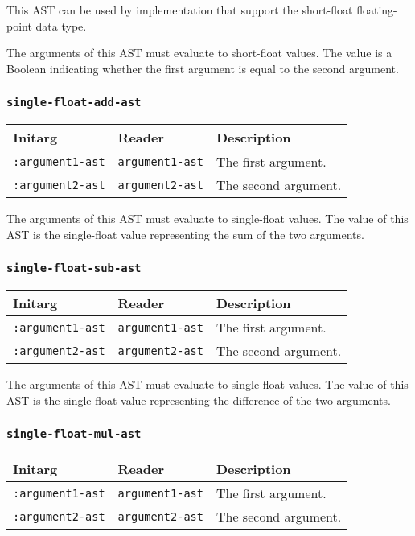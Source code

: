 This AST can be used by implementation that support the short-float
floating-point data type.  

The arguments of this AST must evaluate to short-float
values.  The value is a Boolean indicating whether the first argument
is equal to the second argument.

\subsubsection{\texttt{single-float-add-ast}}
\label{sec-ast-single-float-add}

\begin{tabular}{|l|l|l|}
\hline
Initarg & Reader & Description\\
\hline\hline
\texttt{:argument1-ast} & \texttt{argument1-ast} & The first argument.\\
\hline
\texttt{:argument2-ast} & \texttt{argument2-ast} & The second argument.\\
\hline
\end{tabular}

The arguments of this AST must evaluate to single-float
values.  The value of this AST is the single-float value
representing the sum of the two arguments.

\subsubsection{\texttt{single-float-sub-ast}}
\label{sec-ast-single-float-sub}

\begin{tabular}{|l|l|l|}
\hline
Initarg & Reader & Description\\
\hline\hline
\texttt{:argument1-ast} & \texttt{argument1-ast} & The first argument.\\
\hline
\texttt{:argument2-ast} & \texttt{argument2-ast} & The second argument.\\
\hline
\end{tabular}

The arguments of this AST must evaluate to single-float
values.  The value of this AST is the single-float value
representing the difference of the two arguments.

\subsubsection{\texttt{single-float-mul-ast}}
\label{sec-ast-single-float-mul}

\begin{tabular}{|l|l|l|}
\hline
Initarg & Reader & Description\\
\hline\hline
\texttt{:argument1-ast} & \texttt{argument1-ast} & The first argument.\\
\hline
\texttt{:argument2-ast} & \texttt{argument2-ast} & The second argument.\\
\hline
\end{tabular}

